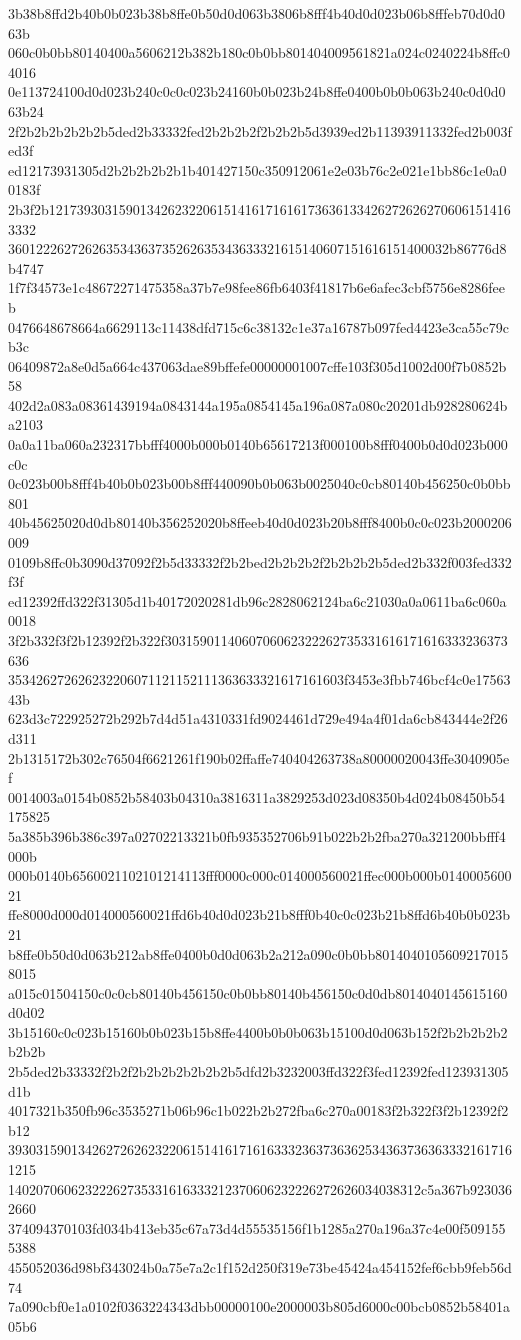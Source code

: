 3b38b8ffd2b40b0b023b38b8ffe0b50d0d063b3806b8fff4b40d0d023b06b8fffeb70d0d063b
060c0b0bb80140400a5606212b382b180c0b0bb801404009561821a024c0240224b8ffc04016
0e113724100d0d023b240c0c0c023b24160b0b023b24b8ffe0400b0b0b063b240c0d0d063b24
2f2b2b2b2b2b2b5ded2b33332fed2b2b2b2f2b2b2b5d3939ed2b11393911332fed2b003fed3f
ed12173931305d2b2b2b2b2b1b401427150c350912061e2e03b76c2e021e1bb86c1e0a00183f
2b3f2b1217393031590134262322061514161716161736361334262726262706061514163332
360122262726263534363735262635343633321615140607151616151400032b86776d8b4747
1f7f34573e1c48672271475358a37b7e98fee86fb6403f41817b6e6afec3cbf5756e8286feeb
0476648678664a6629113c11438dfd715c6c38132c1e37a16787b097fed4423e3ca55c79cb3c
06409872a8e0d5a664c437063dae89bffefe00000001007cffe103f305d1002d00f7b0852b58
402d2a083a08361439194a0843144a195a0854145a196a087a080c20201db928280624ba2103
0a0a11ba060a232317bbfff4000b000b0140b65617213f000100b8fff0400b0d0d023b000c0c
0c023b00b8fff4b40b0b023b00b8fff440090b0b063b0025040c0cb80140b456250c0b0bb801
40b45625020d0db80140b356252020b8ffeeb40d0d023b20b8fff8400b0c0c023b2000206009
0109b8ffc0b3090d37092f2b5d33332f2b2bed2b2b2b2f2b2b2b2b5ded2b332f003fed332f3f
ed12392ffd322f31305d1b40172020281db96c2828062124ba6c21030a0a0611ba6c060a0018
3f2b332f3f2b12392f2b322f3031590114060706062322262735331616171616333236373636
353426272626232206071121152111363633321617161603f3453e3fbb746bcf4c0e1756343b
623d3c722925272b292b7d4d51a4310331fd9024461d729e494a4f01da6cb843444e2f26d311
2b1315172b302c76504f6621261f190b02ffaffe740404263738a80000020043ffe3040905ef
0014003a0154b0852b58403b04310a3816311a3829253d023d08350b4d024b08450b54175825
5a385b396b386c397a02702213321b0fb935352706b91b022b2b2fba270a321200bbfff4000b
000b0140b6560021102101214113fff0000c000c014000560021ffec000b000b014000560021
ffe8000d000d014000560021ffd6b40d0d023b21b8fff0b40c0c023b21b8ffd6b40b0b023b21
b8ffe0b50d0d063b212ab8ffe0400b0d0d063b2a212a090c0b0bb80140401056092170158015
a015c01504150c0c0cb80140b456150c0b0bb80140b456150c0d0db8014040145615160d0d02
3b15160c0c023b15160b0b023b15b8ffe4400b0b0b063b15100d0d063b152f2b2b2b2b2b2b2b
2b5ded2b33332f2b2f2b2b2b2b2b2b2b5dfd2b3232003ffd322f3fed12392fed123931305d1b
4017321b350fb96c3535271b06b96c1b022b2b272fba6c270a00183f2b322f3f2b12392f2b12
3930315901342627262623220615141617161633323637363625343637363633321617161215
14020706062322262735331616333212370606232226272626034038312c5a367b9230362660
374094370103fd034b413eb35c67a73d4d55535156f1b1285a270a196a37c4e00f5091555388
455052036d98bf343024b0a75e7a2c1f152d250f319e73be45424a454152fef6cbb9feb56d74
7a090cbf0e1a0102f0363224343dbb00000100e2000003b805d6000c00bcb0852b58401a05b6
